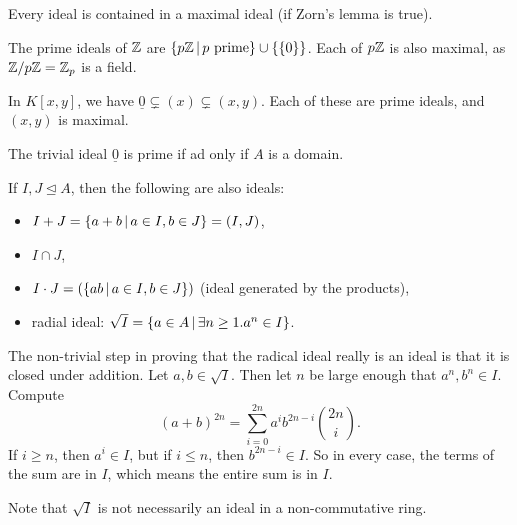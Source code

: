 \begin{remark}
  Every ideal is contained in a maximal ideal (if Zorn's lemma is true).
\end{remark}

\begin{example}
  The prime ideals of $\mathbb{Z}$ are $\{ p \mathbb{Z} \,|\, \text{$p$ prime} \} \cup \{ \{0\}
  \}$.
  Each of $p\mathbb{Z}$ is also maximal, as $\mathbb{Z} / p \mathbb{Z} = \mathbb{Z}_p$ is a field.
\end{example}

\begin{example}
  In $K[x,y]$, we have $\underline{0} \subsetneq (x) \subsetneq (x,y)$.
  Each of these are prime ideals, and $(x,y)$ is maximal.
\end{example}

\begin{remark}
  The trivial ideal $\underline{0}$ is prime if ad only if $A$ is a domain.
\end{remark}

\begin{definition}
  If $I, J \trianglelefteq A$, then the following are also ideals:
  \begin{itemize}
  \item $I + J = \{ a + b \,|\, a \in I, b \in J \} = (I,J)$,
  \item $I \cap J$,
  \item $I \cdot J = (\{ ab \,|\, a \in I, b \in J \})$ (ideal generated by the
	products),
  \item radial ideal: $\sqrt{I} = \{ a \in A \,|\, \exists n \ge 1 . a^n \in I
	\}$.
  \end{itemize}
\end{definition}

\begin{remark}
  The non-trivial step in proving that the radical ideal really is an ideal is
  that it is closed under addition.
  Let $a, b \in \sqrt{I}$.
  Then let $n$ be large enough that $a^n, b^n \in I$.
  Compute
  \[
	(a+b)^{2n} = \sum_{i=0}^{2n} a^i b^{2n-i} \binom{2n}{i}.
  \]
  If $i \ge n$, then $a^i \in I$, but if $i \le n$, then $b^{2n-i} \in I$.
  So in every case, the terms of the sum are in $I$, which means the entire sum
  is in $I$.
\end{remark}

\begin{remark}
  Note that $\sqrt{I}$ is not necessarily an ideal in a non-commutative ring.
\end{remark}

